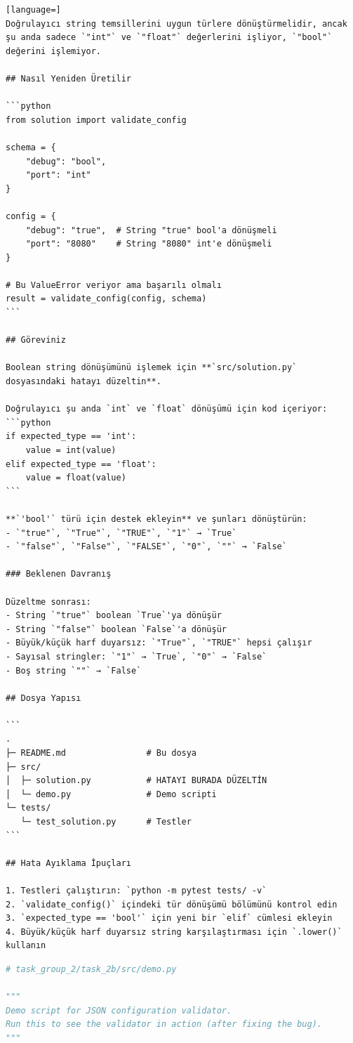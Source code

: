 \begin{appendices}
\begin{lstlisting}[language=]
Doğrulayıcı string temsillerini uygun türlere dönüştürmelidir, ancak şu anda sadece `"int"` ve `"float"` değerlerini işliyor, `"bool"` değerini işlemiyor.

## Nasıl Yeniden Üretilir

```python
from solution import validate_config

schema = {
    "debug": "bool",
    "port": "int"
}

config = {
    "debug": "true",  # String "true" bool'a dönüşmeli
    "port": "8080"    # String "8080" int'e dönüşmeli
}

# Bu ValueError veriyor ama başarılı olmalı
result = validate_config(config, schema)
```

## Göreviniz

Boolean string dönüşümünü işlemek için **`src/solution.py` dosyasındaki hatayı düzeltin**.

Doğrulayıcı şu anda `int` ve `float` dönüşümü için kod içeriyor:
```python
if expected_type == 'int':
    value = int(value)
elif expected_type == 'float':
    value = float(value)
```

**`'bool'` türü için destek ekleyin** ve şunları dönüştürün:
- `"true"`, `"True"`, `"TRUE"`, `"1"` → `True`
- `"false"`, `"False"`, `"FALSE"`, `"0"`, `""` → `False`

### Beklenen Davranış

Düzeltme sonrası:
- String `"true"` boolean `True`'ya dönüşür
- String `"false"` boolean `False`'a dönüşür
- Büyük/küçük harf duyarsız: `"True"`, `"TRUE"` hepsi çalışır
- Sayısal stringler: `"1"` → `True`, `"0"` → `False`
- Boş string `""` → `False`

## Dosya Yapısı

```
.
├─ README.md                # Bu dosya
├─ src/
│  ├─ solution.py           # HATAYI BURADA DÜZELTİN
│  └─ demo.py               # Demo scripti
└─ tests/
   └─ test_solution.py      # Testler
```

## Hata Ayıklama İpuçları

1. Testleri çalıştırın: `python -m pytest tests/ -v`
2. `validate_config()` içindeki tür dönüşümü bölümünü kontrol edin
3. `expected_type == 'bool'` için yeni bir `elif` cümlesi ekleyin
4. Büyük/küçük harf duyarsız string karşılaştırması için `.lower()` kullanın

\end{lstlisting}
\begin{lstlisting}[language=Python]
# task_group_2/task_2b/src/demo.py

"""
Demo script for JSON configuration validator.
Run this to see the validator in action (after fixing the bug).
"""


\end{lstlisting}
\end{appendices}
